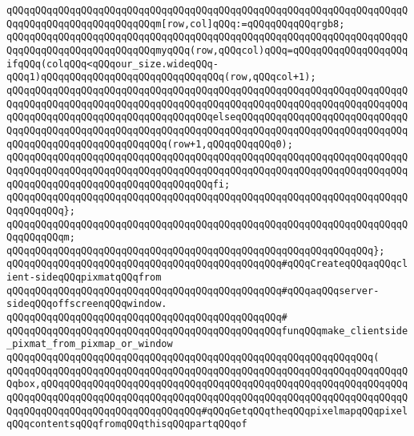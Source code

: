 \newline
\verb|qQQqqQQqqQQqqQQqqQQqqQQqqQQqqQQqqQQqqQQqqQQqqQQqqQQqqQQqqQQqqQQqqQQqqQQqqQQqqQQqqQQqqQQqqQQqqQQqm[row,col]qQQq:=qQQqqQQqqQQqrgb8;|\newline
\newline
\verb|qQQqqQQqqQQqqQQqqQQqqQQqqQQqqQQqqQQqqQQqqQQqqQQqqQQqqQQqqQQqqQQqqQQqqQQqqQQqqQQqqQQqqQQqqQQqqQQqmyqQQq(row,qQQqcol)qQQq=qQQqqQQqqQQqqQQqqQQqifqQQq(colqQQq<qQQqour_size.wideqQQq-qQQq1)qQQqqQQqqQQqqQQqqQQqqQQqqQQqqQQq(row,qQQqcol+1);|\newline
\verb|qQQqqQQqqQQqqQQqqQQqqQQqqQQqqQQqqQQqqQQqqQQqqQQqqQQqqQQqqQQqqQQqqQQqqQQqqQQqqQQqqQQqqQQqqQQqqQQqqQQqqQQqqQQqqQQqqQQqqQQqqQQqqQQqqQQqqQQqqQQqqQQqqQQqqQQqqQQqqQQqqQQqqQQqqQQqqQQqelseqQQqqQQqqQQqqQQqqQQqqQQqqQQqqQQqqQQqqQQqqQQqqQQqqQQqqQQqqQQqqQQqqQQqqQQqqQQqqQQqqQQqqQQqqQQqqQQqqQQqqQQqqQQqqQQqqQQqqQQqqQQqqQQq(row+1,qQQqqQQqqQQq0);|\newline
\verb|qQQqqQQqqQQqqQQqqQQqqQQqqQQqqQQqqQQqqQQqqQQqqQQqqQQqqQQqqQQqqQQqqQQqqQQqqQQqqQQqqQQqqQQqqQQqqQQqqQQqqQQqqQQqqQQqqQQqqQQqqQQqqQQqqQQqqQQqqQQqqQQqqQQqqQQqqQQqqQQqqQQqqQQqqQQqqQQqfi;|\newline
\verb|qQQqqQQqqQQqqQQqqQQqqQQqqQQqqQQqqQQqqQQqqQQqqQQqqQQqqQQqqQQqqQQqqQQqqQQqqQQqqQQq};|\newline
\newline
\verb|qQQqqQQqqQQqqQQqqQQqqQQqqQQqqQQqqQQqqQQqqQQqqQQqqQQqqQQqqQQqqQQqqQQqqQQqqQQqqQQqm;|\newline
\verb|qQQqqQQqqQQqqQQqqQQqqQQqqQQqqQQqqQQqqQQqqQQqqQQqqQQqqQQqqQQqqQQq};|\newline
\newline
\verb|qQQqqQQqqQQqqQQqqQQqqQQqqQQqqQQqqQQqqQQqqQQqqQQq#qQQqCreateqQQqaqQQqclient-sideqQQqpixmatqQQqfrom|\newline
\verb|qQQqqQQqqQQqqQQqqQQqqQQqqQQqqQQqqQQqqQQqqQQqqQQq#qQQqaqQQqserver-sideqQQqoffscreenqQQqwindow.|\newline
\verb|qQQqqQQqqQQqqQQqqQQqqQQqqQQqqQQqqQQqqQQqqQQqqQQq#|\newline
\verb|qQQqqQQqqQQqqQQqqQQqqQQqqQQqqQQqqQQqqQQqqQQqqQQqfunqQQqmake_clientside_pixmat_from_pixmap_or_window|\newline
\verb|qQQqqQQqqQQqqQQqqQQqqQQqqQQqqQQqqQQqqQQqqQQqqQQqqQQqqQQqqQQqqQQq(|\newline
\verb|qQQqqQQqqQQqqQQqqQQqqQQqqQQqqQQqqQQqqQQqqQQqqQQqqQQqqQQqqQQqqQQqqQQqqQQqbox,qQQqqQQqqQQqqQQqqQQqqQQqqQQqqQQqqQQqqQQqqQQqqQQqqQQqqQQqqQQqqQQqqQQqqQQqqQQqqQQqqQQqqQQqqQQqqQQqqQQqqQQqqQQqqQQqqQQqqQQqqQQqqQQqqQQqqQQqqQQqqQQqqQQqqQQqqQQqqQQqqQQqqQQq#qQQqGetqQQqtheqQQqpixelmapqQQqpixelqQQqcontentsqQQqfromqQQqthisqQQqpartqQQqof|\newline

